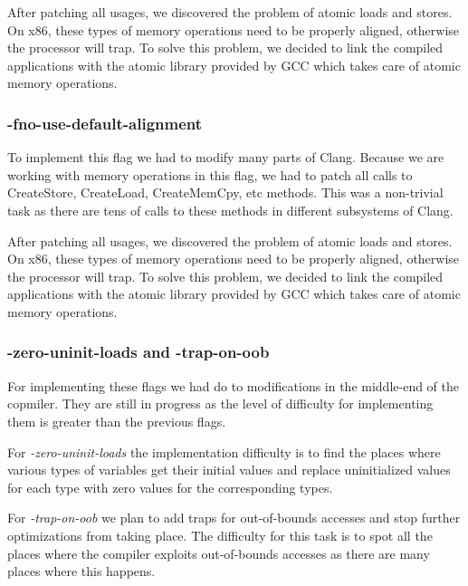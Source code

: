 After patching all usages, we discovered the problem of atomic loads and stores.
On x86, these types of memory operations need to be properly aligned, otherwise
the processor will trap. To solve this problem, we decided to link the compiled
applications with the atomic library provided by GCC which takes care of atomic
memory operations.

\subsubsection{-fno-use-default-alignment}

To implement this flag we had to modify many parts of Clang. Because we are
working with memory operations in this flag, we had to patch all calls to
CreateStore, CreateLoad, CreateMemCpy, etc  methods. This was
a non-trivial task as there are tens of calls to these methods in different
subsystems of Clang.

After patching all usages, we discovered the problem of atomic loads and stores.
On x86, these types of memory operations need to be properly aligned, otherwise
the processor will trap. To solve this problem, we decided to link the compiled
applications with the atomic library provided by GCC which takes care of atomic
memory operations.

\subsubsection{-zero-uninit-loads and -trap-on-oob}

For implementing these flags we had do to modifications in the middle-end of the
copmiler. They are still in progress as the level of difficulty for implementing
them is greater than the previous flags.

For \textit{-zero-uninit-loads} the implementation difficulty is to find the
places where various types of variables get their initial values and replace
uninitialized values for each type with zero values for the corresponding types.

For \textit{-trap-on-oob} we plan to add traps for out-of-bounds accesses and
stop further optimizations from taking place. The difficulty for this task is to
spot all the places where the compiler exploits out-of-bounds accesses as there
are many places where this happens.
